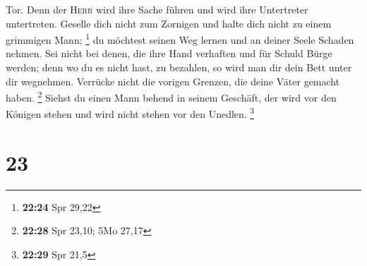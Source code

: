 Tor.  Denn der \textsc{Herr} wird ihre Sache führen und
wird ihre Untertreter untertreten.  Geselle dich nicht
zum Zornigen und halte dich nicht zu einem grimmigen Mann; \footnote{\textbf{22:24}
  Spr 29,22}  du möchtest seinen Weg lernen und an deiner
Seele Schaden nehmen.  Sei nicht bei denen, die ihre Hand
verhaften und für Schuld Bürge werden;  denn wo du es
nicht hast, zu bezahlen, so wird man dir dein Bett unter dir wegnehmen.
 Verrücke nicht die vorigen Grenzen, die deine Väter
gemacht haben. \footnote{\textbf{22:28} Spr 23,10; 5Mo 27,17}
 Siehst du einen Mann behend in seinem Geschäft, der wird
vor den Königen stehen und wird nicht stehen vor den Unedlen.
\footnote{\textbf{22:29} Spr 21,5}

\hypertarget{section-10}{%
\section{23}\label{section-10}}

